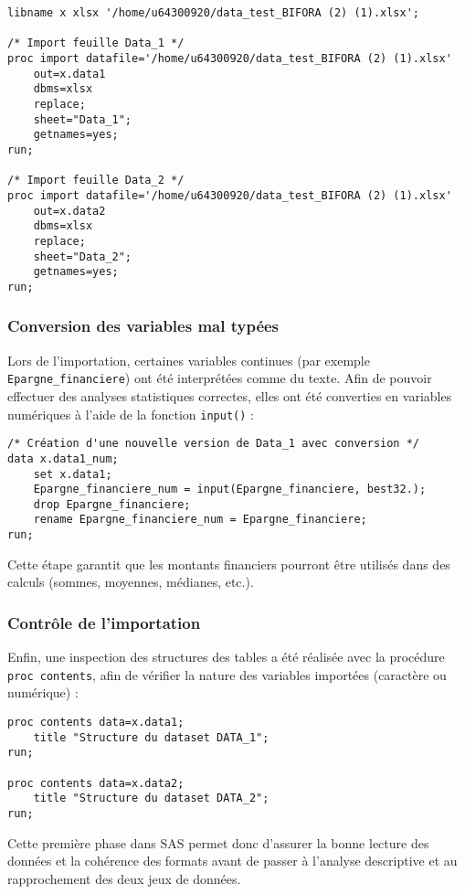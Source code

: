 \begin{lstlisting}[caption=Importation des données dans SAS]
libname x xlsx '/home/u64300920/data_test_BIFORA (2) (1).xlsx';

/* Import feuille Data_1 */
proc import datafile='/home/u64300920/data_test_BIFORA (2) (1).xlsx'
    out=x.data1
    dbms=xlsx
    replace;
    sheet="Data_1";
    getnames=yes;
run;

/* Import feuille Data_2 */
proc import datafile='/home/u64300920/data_test_BIFORA (2) (1).xlsx'
    out=x.data2
    dbms=xlsx
    replace;
    sheet="Data_2";
    getnames=yes;
run;
\end{lstlisting}

\subsubsection{Conversion des variables mal typées}
Lors de l'importation, certaines variables continues (par exemple \texttt{Epargne\_financiere}) ont été interprétées comme du texte.  
Afin de pouvoir effectuer des analyses statistiques correctes, elles ont été converties en variables numériques à l'aide de la fonction \texttt{input()} :

\begin{lstlisting}[caption=Conversion de variables texte en numérique]
/* Création d'une nouvelle version de Data_1 avec conversion */
data x.data1_num;
    set x.data1;
    Epargne_financiere_num = input(Epargne_financiere, best32.);
    drop Epargne_financiere;
    rename Epargne_financiere_num = Epargne_financiere;
run;
\end{lstlisting}

Cette étape garantit que les montants financiers pourront être utilisés dans des calculs (sommes, moyennes, médianes, etc.).

\subsubsection{Contrôle de l'importation}
Enfin, une inspection des structures des tables a été réalisée avec la procédure \texttt{proc contents}, afin de vérifier la nature des variables importées (caractère ou numérique) :

\begin{lstlisting}[caption=Inspection des tables SAS]
proc contents data=x.data1;
    title "Structure du dataset DATA_1";
run;

proc contents data=x.data2;
    title "Structure du dataset DATA_2";
run;
\end{lstlisting}

Cette première phase dans SAS permet donc d'assurer la bonne lecture des données et la cohérence des formats avant de passer à l'analyse descriptive et au rapprochement des deux jeux de données.
